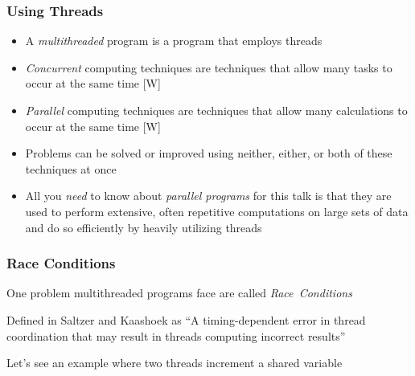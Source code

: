 \documentclass{beamer}
\newcommand{\linespace}{\vskip 0.25cm}
\begin{document}
\begin{frame}
\frametitle{Using Threads}

	\begin{itemize}
  		\item A \emph{multithreaded} program is a program that employs threads
  		
  		\linespace
  		
  		\item \emph{Concurrent} computing techniques are techniques that allow many tasks to occur at the same time [W]
  		
  		\linespace  		
  		
  		\item \emph{Parallel} computing techniques are techniques that allow many calculations to occur at the same time [W]
  		
\linespace  		
  		
		\item Problems can be solved or improved using neither, either, or both of these techniques at once
		
  		\linespace
  		
  		\item All you \emph{need} to know about \emph{parallel programs} for this talk is that they are used to perform extensive, often repetitive computations on large sets of data and do so efficiently by heavily utilizing threads
  		
  		\linespace  		
  		
  		
	  \end{itemize}

\end{frame}


\begin{frame}
\frametitle{Race Conditions}

One problem multithreaded programs face are called \emph{Race~Conditions}

\linespace

Defined in Saltzer and Kaashoek as ``A timing-dependent error in thread coordination that may result in threads computing incorrect results'' 

\linespace

Let's see an example where two threads increment a shared variable
\end{frame}
\end{document}
